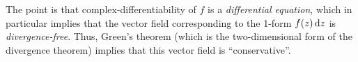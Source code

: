 The point is that complex-differentiability of $f$ is a \emph{differential equation}, which in particular implies that the vector field corresponding to the 1-form $f(z)\,{\mathrm{d} z}$ is \emph{divergence-free}.
Thus, Green's theorem (which is the two-dimensional form of the divergence theorem) implies that this vector field is ``conservative''.

